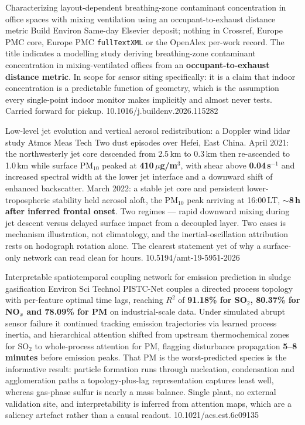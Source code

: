 \documentclass[10pt]{article}
\begin{document}
{Characterizing layout-dependent breathing-zone contaminant concentration in office spaces
with mixing ventilation using an occupant-to-exhaust distance metric}
{Build Environ}
{Same-day Elsevier deposit; nothing in Crossref, Europe PMC core, Europe PMC
\texttt{fullTextXML} or the OpenAlex per-work record. The title indicates a modelling study
deriving breathing-zone contaminant concentration in mixing-ventilated offices from an
\textbf{occupant-to-exhaust distance metric}. In scope for sensor siting specifically: it
is a claim that indoor concentration is a predictable function of geometry, which is the
assumption every single-point indoor monitor makes implicitly and almost never tests.
Carried forward for pickup.}
{10.1016/j.buildenv.2026.115282}


{Low-level jet evolution and vertical aerosol redistribution: a Doppler wind lidar study}
{Atmos Meas Tech}
{Two dust episodes over Hefei, East China. April 2021: the northwesterly jet core
descended from 2.5\,km to 0.3\,km then re-ascended to 1.0\,km while surface PM$_{10}$
peaked at \textbf{410\,$\mu$g/m$^3$}, with shear above \textbf{0.04\,s$^{-1}$} and
increased spectral width at the lower jet interface and a downward shift of enhanced
backscatter. March 2022: a stable jet core and persistent lower-tropospheric stability
held aerosol aloft, the PM$_{10}$ peak arriving at 16:00\,LT, \textbf{$\sim$8\,h after
inferred frontal onset}. Two regimes --- rapid downward mixing during jet descent versus
delayed surface impact from a decoupled layer. Two cases is mechanism illustration, not
climatology, and the inertial-oscillation attribution rests on hodograph rotation alone.
The clearest statement yet of why a surface-only network can read clean for hours.}
{10.5194/amt-19-5951-2026}

{Interpretable spatiotemporal coupling network for emission prediction in sludge
gasification}
{Environ Sci Technol}
{PISTC-Net couples a directed process topology with per-feature optimal time lags,
reaching $R^2$ of \textbf{91.18\% for SO$_2$, 80.37\% for NO$_x$ and 78.09\% for PM} on
industrial-scale data. Under simulated abrupt sensor failure it continued tracking
emission trajectories via learned process inertia, and hierarchical attention shifted from
upstream thermochemical zones for SO$_2$ to whole-process attention for PM, flagging
disturbance propagation \textbf{5--8 minutes} before emission peaks. That PM is the
worst-predicted species is the informative result: particle formation runs through
nucleation, condensation and agglomeration paths a topology-plus-lag representation
captures least well, whereas gas-phase sulfur is nearly a mass balance. Single plant, no
external validation site, and interpretability is inferred from attention maps, which are
a saliency artefact rather than a causal readout.}
{10.1021/acs.est.6c09135}
\end{document}
